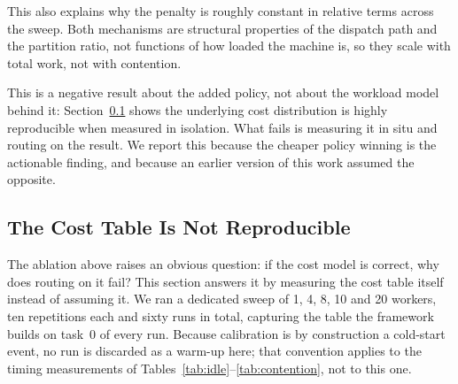 \documentclass[conference]{IEEEtran}
\begin{document}
This also explains why the penalty is roughly constant in relative terms across the sweep. Both mechanisms are structural properties of the dispatch path and the partition ratio, not functions of how loaded the machine is, so they scale with total work, not with contention.

This is a negative result about the added policy, not about the workload model behind it: Section~\ref{sec:layerprofile} shows the underlying cost distribution is highly reproducible when measured in isolation. What fails is measuring it in situ and routing on the result. We report this because the cheaper policy winning is the actionable finding, and because an earlier version of this work assumed the opposite.

\subsection{The Cost Table Is Not Reproducible}
\label{sec:layerprofile}
The ablation above raises an obvious question: if the cost model is correct, why does routing on it fail? This section answers it by measuring the cost table itself instead of assuming it. We ran a dedicated sweep of 1, 4, 8, 10 and 20 workers, ten repetitions each and sixty runs in total, capturing the table the framework builds on task~0 of every run. Because calibration is by construction a cold-start event, no run is discarded as a warm-up here; that convention applies to the timing measurements of Tables~\ref{tab:idle}--\ref{tab:contention}, not to this one.
\end{document}
